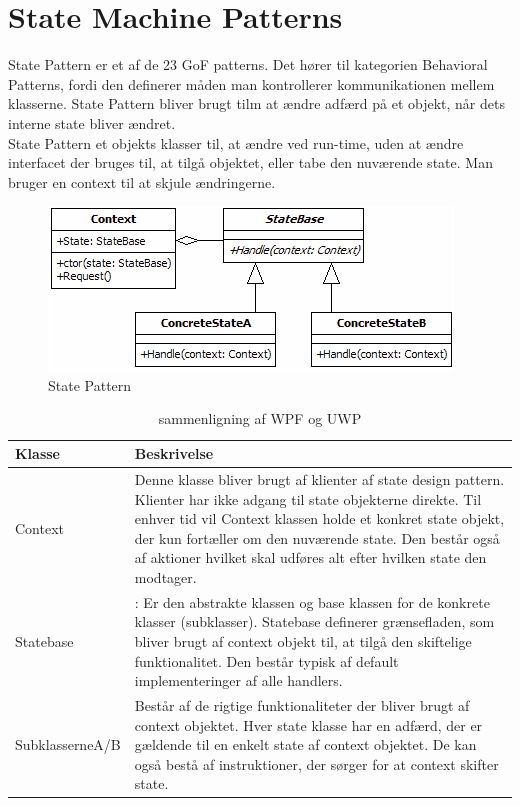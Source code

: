 \documentclass[../report.tex]{subfiles}
\begin{document}
\section{State Machine Patterns}
State Pattern er et af de 23 GoF patterns. Det hører til kategorien Behavioral Patterns, fordi den definerer måden man kontrollerer kommunikationen mellem klasserne. State Pattern bliver brugt tilm at ændre adfærd på et objekt, når dets interne state bliver ændret.
\\

State Pattern et objekts klasser til, at ændre ved run-time, uden at ændre interfacet der bruges til, at tilgå objektet, eller tabe den nuværende state. Man bruger en context til at skjule ændringerne.

\begin{figure}[H]
    \centering
    \includegraphics{pics/state_pattern.PNG}
    \caption{State Pattern}
    \label{fig:state_pattern}
\end{figure}

\begin{table}[H]
    \centering
    \begin{tabular}{l|p{}}
        Klasse          & Beskrivelse        \\ \toprule
        Context                & Denne klasse bliver brugt af klienter af state design pattern. Klienter har ikke adgang til state objekterne direkte. Til enhver tid vil Context klassen holde et konkret state objekt, der kun fortæller om den nuværende state. Den består også af aktioner hvilket skal udføres alt efter hvilken state den modtager.    \\ \midrule
        Statebase &: Er den abstrakte klassen og base klassen for de konkrete klasser (subklasser). Statebase definerer grænsefladen, som bliver brugt af context objekt til, at tilgå den skiftelige funktionalitet. Den består typisk af default implementeringer af alle handlers.        \\ \midrule
        SubklasserneA/B    & Består af de rigtige funktionaliteter der bliver brugt af context objektet. Hver state klasse har en adfærd, der er gældende til en enkelt state af context objektet. De kan også bestå af instruktioner, der sørger for at context skifter state. \\ \bottomrule
    \end{tabular}
    \caption{sammenligning af WPF og UWP}\label{tab:wpfVSuwp}
\end{table}
\end{document}
